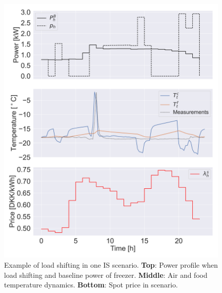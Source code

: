 \begin{figure}[!t]
    \centering
    \includegraphics[width=\columnwidth]{../figures/spot_single_case.png}
    \caption{Example of load shifting in one IS scenario. \textbf{Top}: Power profile when load shifting and baseline power of freezer. \textbf{Middle}: Air and food temperature dynamics. \textbf{Bottom}: Spot price in scenario.}
    \label{fig:fig_first_case}
\end{figure}

